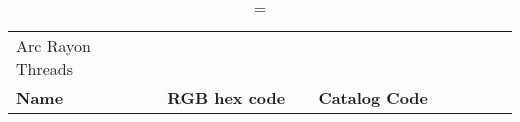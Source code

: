 
\begin{longtable}{p{0.3\linewidth} p{0.3\linewidth} p{0.4\linewidth}}
\caption = {Arc Rayon Threads}
\label{tblr:arcrayon}\\
\textbf{Name} & \textbf{RGB hex code} & \textbf{Catalog Code} \\

\end{longtable}
